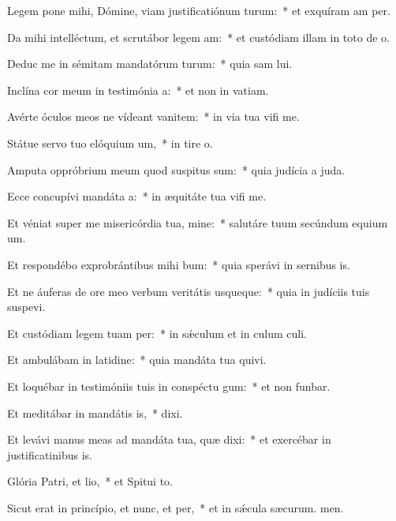 \item Legem pone mihi, Dómine, viam justificatiónum turum:~* et exquíram am per.
\item Da mihi intelléctum, et scrutábor legem am:~* et custódiam illam in toto de o.
\item Deduc me in sémitam mandatórum turum:~* quia sam lui.
\item Inclína cor meum in testimónia a:~* et non in vatiam.
\item Avérte óculos meos ne vídeant vanitem:~* in via tua vifi me.
\item Státue servo tuo elóquium um,~* in tire o.
\item Amputa oppróbrium meum quod suspitus sum:~* quia judícia a juda.
\item Ecce concupívi mandáta a:~* in æquitáte tua vifi me.
\item Et véniat super me misericórdia tua, mine:~* salutáre tuum secúndum equium um.
\item Et respondébo exprobrántibus mihi bum:~* quia sperávi in sernibus is.
\item Et ne áuferas de ore meo verbum veritátis usqueque:~* quia in judíciis tuis suspevi.
\item Et custódiam legem tuam per:~* in sǽculum et in culum culi.
\item Et ambulábam in latidine:~* quia mandáta tua quivi.
\item Et loquébar in testimóniis tuis in conspéctu gum:~* et non funbar.
\item Et meditábar in mandátis is,~*  dixi.
\item Et levávi manus meas ad mandáta tua, quæ dixi:~* et exercébar in justificatinibus is.
\item Glória Patri, et lio,~* et Spitui to.
\item Sicut erat in princípio, et nunc, et per,~* et in sǽcula sæcurum. men.
